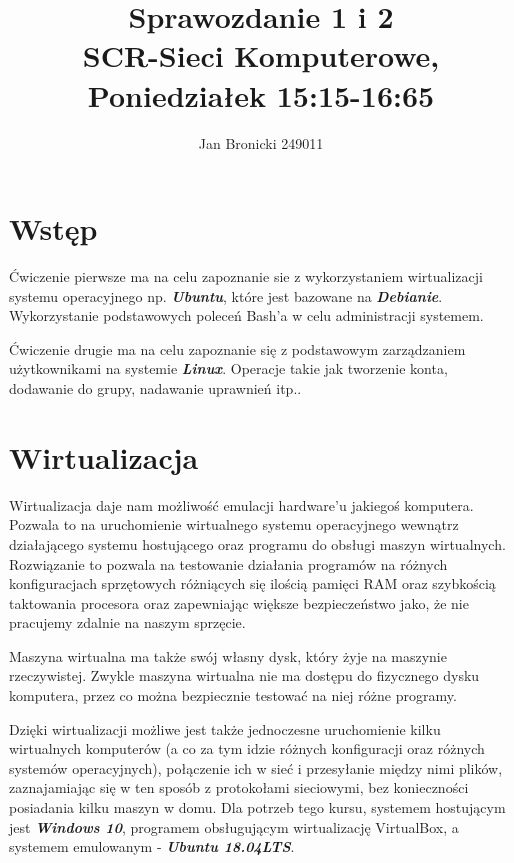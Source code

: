 \documentclass{article}
\title{
    Sprawozdanie 1 i 2\\

    \LARGE SCR-Sieci Komputerowe,\\

    Poniedziałek 15:15-16:65
}
\author{Jan Bronicki 249011 }
\date{}
\begin{document}
\maketitle





\section{Wstęp}\par
Ćwiczenie pierwsze ma na celu zapoznanie sie z wykorzystaniem wirtualizacji systemu operacyjnego np. \emph{\textbf{Ubuntu}}, które jest bazowane na \emph{\textbf{Debianie}}. Wykorzystanie podstawowych poleceń Bash'a w celu administracji systemem.\par
Ćwiczenie drugie ma na celu zapoznanie się z podstawowym zarządzaniem użytkownikami na systemie \emph{\textbf{Linux}}. Operacje takie jak tworzenie konta, dodawanie do grupy, nadawanie uprawnień itp..






\section{Wirtualizacja}
Wirtualizacja daje nam możliwość emulacji hardware'u jakiegoś komputera. Pozwala to na uruchomienie wirtualnego systemu operacyjnego wewnątrz
działającego systemu hostującego oraz programu do obsługi maszyn wirtualnych. Rozwiązanie to pozwala na testowanie działania programów na różnych
konfiguracjach sprzętowych różniących się ilością pamięci RAM oraz szybkością taktowania procesora oraz zapewniając większe bezpieczeństwo jako, że nie pracujemy zdalnie na naszym sprzęcie. \par 

Maszyna wirtualna ma także swój własny dysk, który żyje na maszynie rzeczywistej. Zwykle maszyna wirtualna nie ma dostępu do fizycznego dysku komputera, przez co można bezpiecznie testować na niej różne programy.\par

Dzięki wirtualizacji możliwe jest także jednoczesne uruchomienie kilku wirtualnych
komputerów (a co za tym idzie różnych konfiguracji oraz różnych systemów operacyjnych), połączenie ich w sieć i przesyłanie między nimi plików, zaznajamiając
się w ten sposób z protokołami sieciowymi, bez konieczności posiadania kilku maszyn
w domu. Dla potrzeb tego kursu, systemem hostującym jest \emph{\textbf{Windows 10}}, programem
obsługującym wirtualizację VirtualBox, a systemem emulowanym - \emph{\textbf{Ubuntu 18.04LTS}}.
\end{document}
